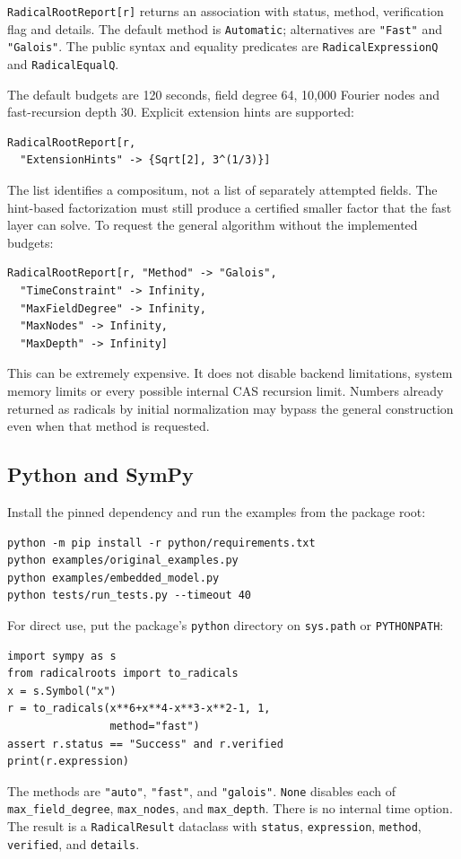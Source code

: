 \documentclass[11pt,letterpaper]{article}
\newcommand{\code}[1]{\texttt{#1}}
\theoremstyle{definition}\newtheorem{definition}[theorem]{Definition}
\theoremstyle{remark}\newtheorem{remark}[theorem]{Remark}
\begin{document}
\code{RadicalRootReport[r]} returns an
association with status, method, verification flag and details. The default
method is \code{Automatic}; alternatives are \code{"Fast"} and
\code{"Galois"}. The public syntax and equality predicates are
\code{RadicalExpressionQ} and \code{RadicalEqualQ}.

The default budgets are 120 seconds, field degree 64, 10,000 Fourier nodes
and fast-recursion depth 30. Explicit extension hints are supported:
\begin{lstlisting}
RadicalRootReport[r,
  "ExtensionHints" -> {Sqrt[2], 3^(1/3)}]
\end{lstlisting}
The list identifies a compositum, not a list of separately attempted fields.
The hint-based factorization must still produce a certified smaller factor
that the fast layer can solve. To request the general algorithm without the
implemented budgets:
\begin{lstlisting}
RadicalRootReport[r, "Method" -> "Galois",
  "TimeConstraint" -> Infinity,
  "MaxFieldDegree" -> Infinity,
  "MaxNodes" -> Infinity,
  "MaxDepth" -> Infinity]
\end{lstlisting}
This can be extremely expensive. It does not disable backend limitations,
system memory limits or every possible internal CAS recursion limit.
Numbers already returned as radicals by initial normalization may bypass
the general construction even when that method is requested.

\subsection{Python and SymPy}

Install the pinned dependency and run the examples from the package root:
\begin{lstlisting}
python -m pip install -r python/requirements.txt
python examples/original_examples.py
python examples/embedded_model.py
python tests/run_tests.py --timeout 40
\end{lstlisting}
For direct use, put the package's \code{python} directory on \code{sys.path}
or \code{PYTHONPATH}:
\begin{lstlisting}
import sympy as s
from radicalroots import to_radicals
x = s.Symbol("x")
r = to_radicals(x**6+x**4-x**3-x**2-1, 1,
                method="fast")
assert r.status == "Success" and r.verified
print(r.expression)
\end{lstlisting}
The methods are \code{"auto"}, \code{"fast"}, and \code{"galois"}.
\code{None} disables each of \code{max\_field\_degree},
\code{max\_nodes}, and \code{max\_depth}. There is no internal time option.
The result is a \code{RadicalResult} dataclass with \code{status},
\code{expression}, \code{method}, \code{verified}, and \code{details}.
\end{document}
